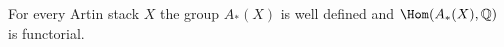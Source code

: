 \begin{theorem}\label{Kre99-thm-2.1}
For every Artin stack $X$ the group $A_*(X)$ is well defined and $\Hom(A_*(X), \mathbb{Q})$ is functorial.
\end{theorem}
